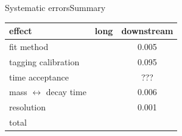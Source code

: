 \documentclass{beamer}
\begin{document}
\begin{frame}{Systematic errors}{Summary}
\begin{center}
\begin{tabular}{l c c}
\hline \hline
effect & long & downstream \\ \hline
fit  method & & 0.005\\
tagging calibration & & 0.095\\
time acceptance & & ???\\
mass $\leftrightarrow$ decay time & & 0.006 \\
resolution & & 0.001 \\ \hline
total & & \\
\hline \hline
\end{tabular}
\end{center}

\end{frame}



\end{document}
